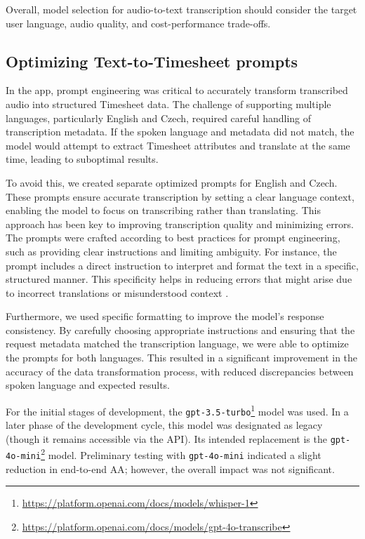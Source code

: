 \documentclass[
  digital,     %
  oneside,     %
  nosansbold,  %
  nocolorbold, %
  lof,         %
  lot,         %
]{fithesis4}
\begin{document}
Overall, model selection for audio-to-text transcription should consider the target user language, audio quality, and cost-performance trade-offs.

\subsection{Optimizing Text-to-Timesheet prompts}

In the app, prompt engineering was critical to accurately transform transcribed audio into structured Timesheet data. The challenge of supporting multiple languages, particularly English and Czech, required careful handling of transcription metadata. If the spoken language and metadata did not match, the model would attempt to extract Timesheet attributes and translate at the same time, leading to suboptimal results.

To avoid this, we created separate optimized prompts for English and Czech. These prompts ensure accurate transcription by setting a clear language context, enabling the model to focus on transcribing rather than translating. This approach has been key to improving transcription quality and minimizing errors. The prompts were crafted according to best practices for prompt engineering, such as providing clear instructions and limiting ambiguity. For instance, the prompt includes a direct instruction to interpret and format the text in a specific, structured manner. This specificity helps in reducing errors that might arise due to incorrect translations or misunderstood context \cite{openaiPrompt}.

Furthermore, we used specific formatting to improve the model’s response consistency. By carefully choosing appropriate instructions and ensuring that the request metadata matched the transcription language, we were able to optimize the prompts for both languages. This resulted in a significant improvement in the accuracy of the data transformation process, with reduced discrepancies between spoken language and expected results.

For the initial stages of development, the \texttt{gpt-3.5-turbo}\footnote{\url{https://platform.openai.com/docs/models/whisper-1}} model was used. In a later phase of the development cycle, this model was designated as legacy (though it remains accessible via the \gls{API}). Its intended replacement is the \texttt{gpt-4o-mini}\footnote{\url{https://platform.openai.com/docs/models/gpt-4o-transcribe}} model. Preliminary testing with \texttt{gpt-4o-mini} indicated a slight reduction in end-to-end \gls{AA}; however, the overall impact was not significant.
\end{document}
